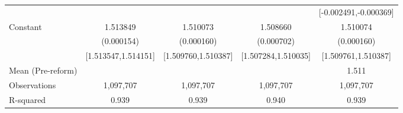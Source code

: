 {\begin{tabular}{l*{4}{c}}
                    &                     &                     &                     &[-0.002491,-0.000369]         \\
Constant            &    1.513849\sym{***}&    1.510073\sym{***}&    1.508660\sym{***}&    1.510074\sym{***}\\
                    &  (0.000154)         &  (0.000160)         &  (0.000702)         &  (0.000160)         \\
                    &[1.513547,1.514151]         &[1.509760,1.510387]         &[1.507284,1.510035]         &[1.509761,1.510387]         \\
\midrule
Mean (Pre-reform)   &                     &                     &                     &       1.511         \\
Observations        &   1,097,707         &   1,097,707         &   1,097,707         &   1,097,707         \\
R-squared           &       0.939         &       0.939         &       0.940         &       0.939         \\
\bottomrule
\end{tabular}
}
